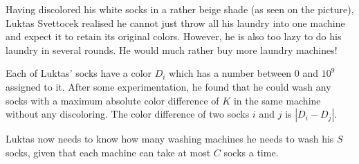Having discolored his white socks in a rather beige shade (as seen on the picture), 
Luktas Svettocek realised he cannot just throw all his laundry into one machine and 
expect it to retain its original colors. However, he is also too lazy to do his 
laundry in several rounds. He would much rather buy more laundry machines!

Each of Luktas' socks have a color $D_i$ which has a number between $0$ and $10^9$ assigned to it. 
After some experimentation, he found that he could wash any socks with a maximum absolute color difference of $K$ 
in the same machine without any discoloring. The color difference of two socks $i$ and $j$ is $\left|D_i-D_j\right|$.

Luktas now needs to know how many washing machines he needs to wash his $S$ socks, 
given that each machine can take at most $C$ socks a time.
